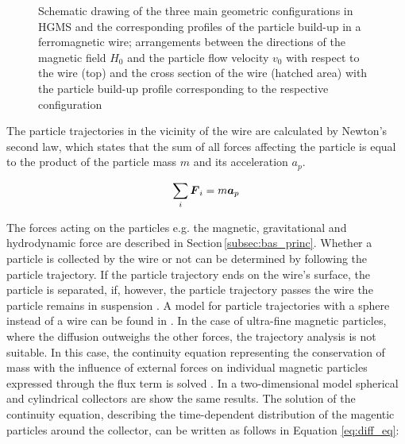 \begin{figure}[h]
\centering

\caption[Geometric configurations in HGMS and particle build-up]{Schematic drawing of the three main geometric configurations in HGMS and the corresponding profiles of the particle build-up in a ferromagnetic wire; arrangements between the directions of the magnetic field $H_{0}$ and the particle flow velocity $v_{0}$ with respect to the wire (top) and the cross section of the wire (hatched area) with the particle build-up profile corresponding to the respective configuration \cite{svoboda2004magnetic}
\label{fig:hgms_config}
}
\end{figure}

The particle trajectories in the vicinity of the wire are calculated by Newton's second law, which states that the sum of all forces affecting the particle is equal to the product of the particle mass $m$ and its acceleration $a_{p}$. 

\begin{equation}
\label{eq:mag_force_sum}
\centering
\sum_{i}\boldsymbol{F}_{i} = m\boldsymbol{a}_{p}
\end{equation}
 
The forces acting on the particles e.g. the magnetic, gravitational and hydrodynamic force are described in Section\,\ref{subsec:bas_princ}. Whether a particle is collected by the wire or not can be determined by following the particle trajectory. If the particle trajectory ends on the wire's surface, the particle is separated, if, however, the particle trajectory passes the wire the particle remains in suspension \cite{FranzrebHabil}. A model for particle trajectories with a sphere instead of a wire can be found in \cite{friedlaender1981particle,moyer1986filtration}. \newline 
In the case of ultra-fine magnetic particles, where the diffusion outweighs the other forces, the trajectory analysis is not suitable. In this case, the continuity equation representing the conservation of mass with the influence of external forces on individual magnetic particles expressed through the flux term is solved \cite{choomphon2017simulation}. In a two-dimensional model spherical and cylindrical collectors are show the same results. The solution of the continuity equation, describing the time-dependent distribution of the magentic particles around the collector, can be written as follows in Equation \ref{eq:diff_eq}:     

